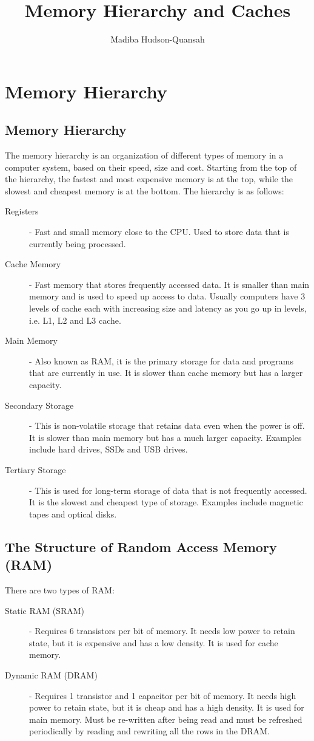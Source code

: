 \documentclass[12pt letter]{report}
\title{\Huge{Memory Hierarchy and Caches}}
\author{\huge{Madiba Hudson-Quansah}}
\date{}
\begin{document}
\maketitle
\newpage
{}
\tableofcontents
\pagebreak

\chapter{Memory Hierarchy}

\section{Memory Hierarchy}
The memory hierarchy is an organization of different types of memory in a computer system, based on their speed, size and cost. Starting from the top of the hierarchy, the fastest and most expensive memory is at the top, while the slowest and cheapest memory is at the bottom. The hierarchy is as follows:
\begin{description}
  \item[Registers] - Fast and small memory close to the CPU. Used to store data that is currently being processed.
  \item[Cache Memory] - Fast memory that stores frequently accessed data. It is smaller than main memory and is used to speed up access to data. Usually computers have 3 levels of cache each with increasing size and latency as you go up in levels, i.e. L1, L2 and L3 cache.
  \item[Main Memory] - Also known as RAM, it is the primary storage for data and programs that are currently in use. It is slower than cache memory but has a larger capacity.
  \item[Secondary Storage] - This is non-volatile storage that retains data even when the power is off. It is slower than main memory but has a much larger capacity. Examples include hard drives, SSDs and USB drives.
  \item[Tertiary Storage] - This is used for long-term storage of data that is not frequently accessed. It is the slowest and cheapest type of storage. Examples include magnetic tapes and optical disks.
\end{description}

\section{The Structure of Random Access Memory (RAM)}
There are two types of RAM:
\begin{description}
  \item[Static RAM (SRAM)] - Requires 6 transistors per bit of memory. It needs low power to retain state, but it is expensive and has a low density. It is used for cache memory.
  \item[Dynamic RAM (DRAM)] - Requires 1 transistor and 1 capacitor per bit of memory. It needs high power to retain state, but it is cheap and has a high density. It is used for main memory. Must be re-written after being read and must be refreshed periodically by reading and rewriting all the rows in the DRAM.
\end{description}
\end{document}
